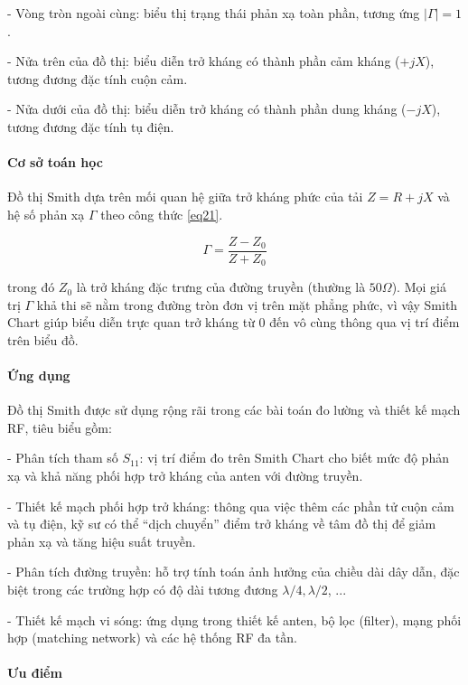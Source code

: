 \documentclass{article}
\begin{document}
	- Vòng tròn ngoài cùng: biểu thị trạng thái phản xạ toàn phần, tương ứng $|\Gamma|=1$.
	
	- Nửa trên của đồ thị: biểu diễn trở kháng có thành phần cảm kháng ($+jX$), tương đương đặc tính cuộn cảm.
	
	- Nửa dưới của đồ thị: biểu diễn trở kháng có thành phần dung kháng ($-jX$), tương đương đặc tính tụ điện.
	
	\paragraph{Cơ sở toán học}\mbox{}
	
	Đồ thị Smith dựa trên mối quan hệ giữa trở kháng phức của tải $Z = R+jX$ và hệ số phản xạ $\Gamma$ theo công thức \ref{eq21}.
	
	\begin{equation}\label{eq21}
		\Gamma = \dfrac{Z - Z_0}{Z + Z_0}
	\end{equation}
	
	trong đó $Z_0$ là trở kháng đặc trưng của đường truyền (thường là $50\Omega$). Mọi giá trị $\Gamma$ khả thi sẽ nằm trong đường tròn đơn vị trên mặt phẳng phức, vì vậy Smith Chart giúp biểu diễn trực quan trở kháng từ 0 đến vô cùng thông qua vị trí điểm trên biểu đồ.
	
	\paragraph{Ứng dụng}\mbox{}
	
	Đồ thị Smith được sử dụng rộng rãi trong các bài toán đo lường và thiết kế mạch RF, tiêu biểu gồm:
	
	- Phân tích tham số $S_{11}$: vị trí điểm đo trên Smith Chart cho biết mức độ phản xạ và khả năng phối hợp trở kháng của anten với đường truyền.
	
	- Thiết kế mạch phối hợp trở kháng: thông qua việc thêm các phần tử cuộn cảm và tụ điện, kỹ sư có thể “dịch chuyển” điểm trở kháng về tâm đồ thị để giảm phản xạ và tăng hiệu suất truyền.
	
	- Phân tích đường truyền: hỗ trợ tính toán ảnh hưởng của chiều dài dây dẫn, đặc biệt trong các trường hợp có độ dài tương đương $\lambda/4, \lambda/2$, ...
	
	- Thiết kế mạch vi sóng: ứng dụng trong thiết kế anten, bộ lọc (filter), mạng phối hợp (matching network) và các hệ thống RF đa tần.
	
	\paragraph{Ưu điểm}\mbox{}
	
\end{document}
